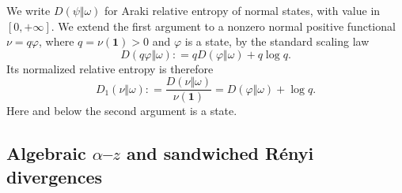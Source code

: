 \documentclass[12pt]{article}
\numberwithin{equation}{section}
\theoremstyle{definition}
\theoremstyle{remark}
\newcommand{\one}{\mathbf 1}
\newcommand{\?}{\overset{?}{=}}
\newcommand{\defeq}{\mathrel{\mathop:}=}
\begin{document}
We write $D(\psi\Vert\omega)$ for Araki relative entropy of normal states,
with value in $[0,+\infty]$.  We extend the first argument to a nonzero
normal positive functional $\nu=q\varphi$, where $q=\nu(\one)>0$ and
$\varphi$ is a state, by the standard scaling law
\begin{equation}
  D(q\varphi\Vert\omega)
  \defeq qD(\varphi\Vert\omega)+q\log q.
  \label{eq:araki-relative-entropy-scaling}
\end{equation}
Its normalized relative entropy is therefore
\begin{equation}
  D_1(\nu\Vert\omega)
  \defeq \frac{D(\nu\Vert\omega)}{\nu(\one)}
  =D(\varphi\Vert\omega)+\log q.
  \label{eq:relative-entropy-scaling}
\end{equation}
Here and below the second argument is a state.

\subsection{Algebraic \texorpdfstring{$\alpha$--$z$}{alpha-z} and
sandwiched R\'enyi divergences}
\end{document}
